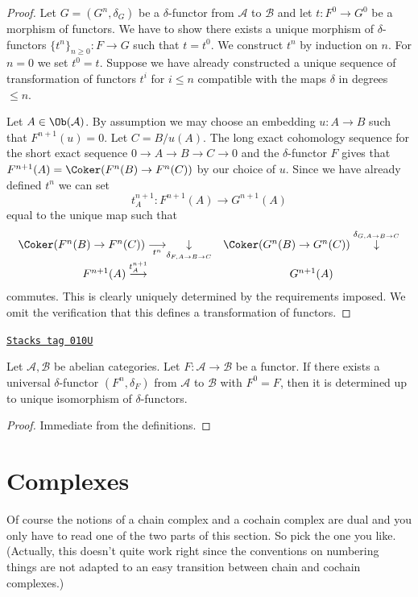 \begin{proof}
Let $G = (G^n, \delta_G)$ be a $\delta$-functor
from $\mathcal{A}$ to $\mathcal{B}$ and let $t : F^0 \to G^0$
be a morphism of functors. We have to show there exists
a unique morphism of $\delta$-functors $\{t^n\}_{n \geq 0} : F \to G$
such that $t = t^0$. We construct $t^n$ by induction on $n$.
For $n = 0$ we set $t^0 = t$.
Suppose we have already constructed a unique sequence of
transformation of functors $t^i$ for $i \leq n$ compatible with
the maps $\delta$ in degrees $\leq n$.

\medskip\noindent
Let $A \in \Ob(\mathcal{A})$. By assumption we may choose
an embedding $u : A \to B$ such that $F^{n + 1}(u) = 0$.
Let $C = B/u(A)$. The long exact cohomology sequence for
the short exact sequence $0 \to A \to B \to C \to 0$ and the
$\delta$-functor $F$ gives that
$F^{n + 1}(A) = \Coker(F^n(B) \to F^n(C))$ by our choice of $u$.
Since we have already defined $t^n$ we can set
$$
t^{n + 1}_A : F^{n + 1}(A) \to G^{n + 1}(A)
$$
equal to the unique map such that
$$
\begin{array}{cc}\Coker(F^n(B) \to F^n(C)) \underset{t^n}{\longrightarrow}\underset{\delta_{F, A \to B \to C}}{\downarrow} & \Coker(G^n(B) \to G^n(C))
\overset{\delta_{G, A \to B \to C}}{\downarrow} \\ F^{n + 1}(A) \overset{t^{n + 1}_A}{\longrightarrow} & G^{n + 1}(A)\end{array}
$$
commutes. This is clearly uniquely determined by the requirements
imposed. We omit the verification that this defines a transformation
of functors.
\end{proof}

\begin{lemma}
\label{homology-lemma-uniqueness-universal-delta-functor}
\href{https://stacks.math.columbia.edu/tag/010U}{\texttt{Stacks tag 010U}}

Let $\mathcal{A}, \mathcal{B}$ be abelian categories.
Let $F : \mathcal{A} \to \mathcal{B}$ be a functor.
If there exists a universal $\delta$-functor
$(F^n, \delta_F)$ from $\mathcal{A}$ to $\mathcal{B}$
with $F^0 = F$, then it is determined up to unique isomorphism
of $\delta$-functors.
\end{lemma}

\begin{proof}
Immediate from the definitions.
\end{proof}

\section{Complexes}
\label{homology-section-complexes}
Of course the notions of a chain complex and a cochain complex
are dual and you only have to read one of the two parts of
this section. So pick the one you like. (Actually, this doesn't
quite work right since the conventions on numbering things
are not adapted to an easy transition between chain and cochain
complexes.)

